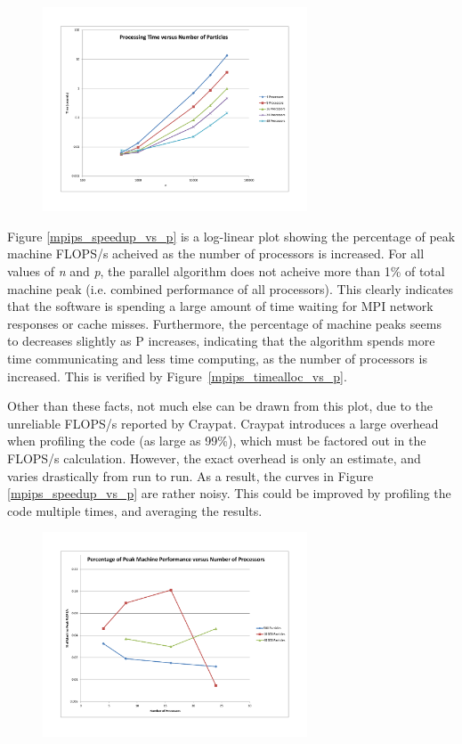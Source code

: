 \documentclass[11pt]{article} %
\begin{document}
\begin{figure}[!h]
\centering
\includegraphics*[width=0.7\textwidth, viewport= 70 70 730 550]{figures/mpips_time_vs_n}
\caption{}
\label{mpips_time_vs_n}
\end{figure}

Figure \ref{mpips_speedup_vs_p} is a log-linear plot showing the percentage of peak machine FLOPS/s acheived as the number of processors is increased. For all values of {\em n} and {\em p}, the parallel algorithm does not acheive more than 1\% of total machine peak (i.e. combined performance of all processors). This clearly indicates that the software is spending a large amount of time waiting for MPI network responses or cache misses. Furthermore, the percentage of machine peaks seems to decreases slightly as P increases, indicating that the algorithm spends more time communicating and less time computing, as the number of processors is increased. This is verified by Figure~\ref{mpips_timealloc_vs_p}.

Other than these facts, not much else can be drawn from this plot, due to the unreliable FLOPS/s reported by Craypat. Craypat introduces a large overhead when profiling the code (as large as 99\%), which must be factored out in the FLOPS/s calculation. However, the exact overhead is only an estimate, and varies drastically from run to run. As a result, the curves in Figure \ref{mpips_speedup_vs_p} are rather noisy. This could be improved by profiling the code multiple times, and averaging the results.

\begin{figure}[!h]
\centering
\includegraphics*[width=0.7\textwidth, viewport= 70 70 730 550]{figures/mpips_flops_vs_p}
\caption{}
\label{mpips_flops_vs_p}
\end{figure}
\end{document}
